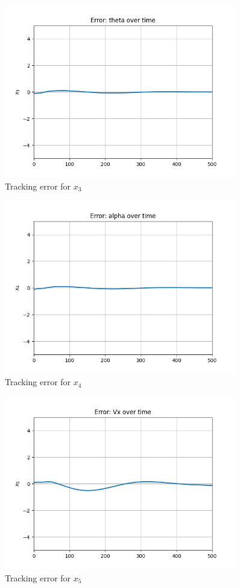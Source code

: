 \begin{figure}[H]
\centering
\includegraphics[width=0.9\textwidth]{pictures/mpc13.png}
\caption{Tracking error for $x_3$}
\label{fig:mpc13}
\end{figure}

\begin{figure}[H]
\centering
\includegraphics[width=0.9\textwidth]{pictures/mpc14.png}
\caption{Tracking error for $x_4$}
\label{fig:mpc14}
\end{figure}

\begin{figure}[H]
\centering
\includegraphics[width=0.9\textwidth]{pictures/mpc15.png}
\caption{Tracking error for $x_5$}
\label{fig:mpc15}
\end{figure}

